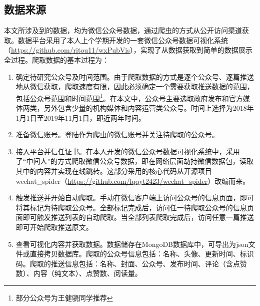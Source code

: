 \documentclass[a4paper,12pt,UTF8]{article}
\begin{document}
    \subsection{数据来源}
    本文所涉及到的数据，均为微信公众号数据，通过爬虫的方式从公开访问渠道获取。数据平台采用了本人上个学期开发的一套微信公众号数据可视化系统（\url{https://github.com/ritou11/wxPubVis}），实现了从数据获取到简单的数据展示全过程。爬取数据的基本过程为：
    \begin{enumerate}
      \item 确定待研究公众号及时间范围。由于爬取数据的方式是逐个公众号、逐篇推送地从微信获取，爬取速度有限，因此必须确定一个需要获取推送数据的范围，包括公众号范围和时间范围\thanks{部分公众号为王健骁同学推荐}。在本文中，公众号主要选取政府发布和官方媒体两类，另外包含少量的机构媒体和内容运营类公众号。时间上选择为2018年1月1日至2019年11月1日，即近两年时间。
      \item 准备微信账号。登陆作为爬虫的微信账号并关注待爬取的公众号。
      \item 接入平台并信任证书。在本人开发的微信公众号数据可视化系统中，采用了“中间人”的方式爬取微信公众号数据，即在网络层面劫持微信数据包，读取其中的内容并实现在线跳转。这部分采用的核心代码从开源项目wechat\_spider（\url{https://github.com/lqqyt2423/wechat_spider}）改编而来。
      \item 触发推送并开始自动爬取。手动在微信客户端上访问公众号的信息页面，即可将其标记为待爬取公众号。全部标记完成后，访问任一待爬取公众号的信息页面即可触发推送列表的自动爬取。当全部列表爬取完成后，访问任意一篇推送即可开始爬取推送原文。
      \item 查看可视化内容并获取数据。数据储存在MongoDB数据库中，可导出为json文件或直接拷贝数据库。爬取的公众号信息包括：名称、头像、更新时间、标识码。爬取的推送信息包括：名称、封面、公众号、发布时间、评论（含点赞数）、内容（纯文本）、点赞数、阅读量。
    \end{enumerate}
\end{document}

